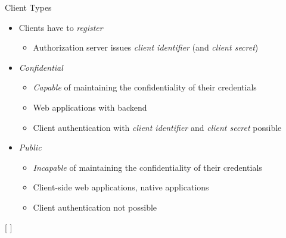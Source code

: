 \documentclass[aspectratio=169]{beamer}
\begin{document}
\begin{frame}{Client Types}
	\begin{itemize}
		\item Clients have to \emph{register}
		\begin{itemize}
			\item Authorization server issues \emph{client identifier} (and \emph{client secret})
		\end{itemize}
		\pause
		\item \emph{Confidential}
		\begin{itemize}
			\item \emph{Capable} of maintaining the confidentiality of their credentials
			\item Web applications with backend
			\item Client authentication with \emph{client identifier} and \emph{client secret} possible
		\end{itemize}
		\pause
		\item \emph{Public}
		\begin{itemize}
			\item \emph{Incapable} of maintaining the confidentiality of their credentials
			\item Client-side web applications, native applications 
			\item Client authentication not possible
		\end{itemize}
	\end{itemize}
\end{frame}

[
	\label{auth-code-flow}
]
\end{document}

